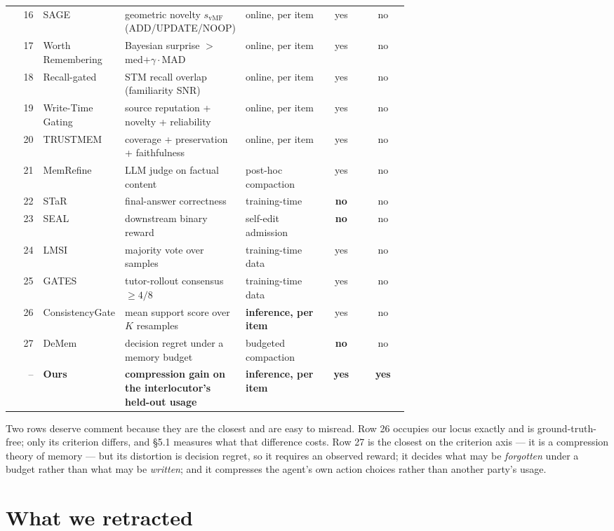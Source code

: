 \documentclass[11pt]{article}
\begin{document}
\begin{table}[h]
\begin{tabular}{@{}rp{0.19\linewidth}p{0.27\linewidth}p{0.20\linewidth}cc@{}}
16 & SAGE & geometric novelty $s_{\text{vMF}}$ (ADD/UPDATE/NOOP) & online, per item & yes & no \\
17 & Worth Remembering & Bayesian surprise $>$ med$+\gamma\cdot$MAD & online, per item & yes & no \\
18 & Recall-gated & STM recall overlap (familiarity SNR) & online, per item & yes & no \\
19 & Write-Time Gating & source reputation + novelty + reliability & online, per item & yes & no \\
20 & TRUSTMEM & coverage + preservation + faithfulness & online, per item & yes & no \\
21 & MemRefine & LLM judge on factual content & post-hoc compaction & yes & no \\
22 & STaR & final-answer correctness & training-time & \textbf{no} & no \\
23 & SEAL & downstream binary reward & self-edit admission & \textbf{no} & no \\
24 & LMSI & majority vote over samples & training-time data & yes & no \\
25 & GATES & tutor-rollout consensus $\geq 4/8$ & training-time data & yes & no \\
26 & ConsistencyGate & mean support score over $K$ resamples & \textbf{inference, per item} & yes & no \\
27 & DeMem & decision regret under a memory budget & budgeted compaction & \textbf{no} & no \\
\midrule
-- & \textbf{Ours} & \textbf{compression gain on the interlocutor's held-out usage}
   & \textbf{inference, per item} & \textbf{yes} & \textbf{yes} \\
\bottomrule
\end{tabular}
\end{table}

Two rows deserve comment because they are the closest and are easy to misread. Row 26
occupies our locus exactly and is ground-truth-free; only its criterion differs, and
\S5.1 measures what that difference costs. Row 27 is the closest on the criterion axis
--- it is a compression theory of memory --- but its distortion is decision regret, so it
requires an observed reward; it decides what may be \emph{forgotten} under a budget rather
than what may be \emph{written}; and it compresses the agent's own action choices rather
than another party's usage.

\section{What we retracted}
\label{app:retractions}
\end{document}
